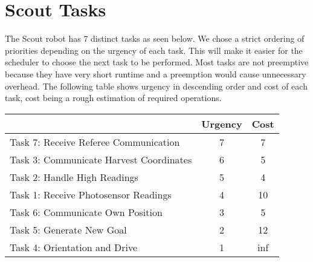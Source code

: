 \documentclass[12pt]{article}
\begin{document}
\section*{Scout Tasks}
The Scout robot has 7 distinct tasks as seen below. We chose a strict ordering of priorities depending on the urgency of each task. This will make it easier for the scheduler to choose the next task to be performed. Most tasks are not preemptive because they have very short runtime and a preemption would cause unnecessary overhead. The following table shows urgency in descending order and cost of each task, cost being a rough estimation of required operations.
\begin{center}
\begin{tabular}{| l | | c | c |}
  \hline
	& Urgency & Cost \\
  \hline
  Task 7: Receive Referee Communication & 7 & 7 \\
  Task 3: Communicate Harvest Coordinates & 6 & 5 \\
  Task 2: Handle High Readings & 5 & 4 \\
  Task 1: Receive Photosensor Readings & 4 & 10 \\
  Task 6: Communicate Own Position &  3 & 5 \\
  Task 5: Generate New Goal &  2 & 12\\
  Task 4: Orientation and Drive &  1 & inf \\
  \hline
\end{tabular}
\end{center}
\vspace*{1cm}
\end{document}
